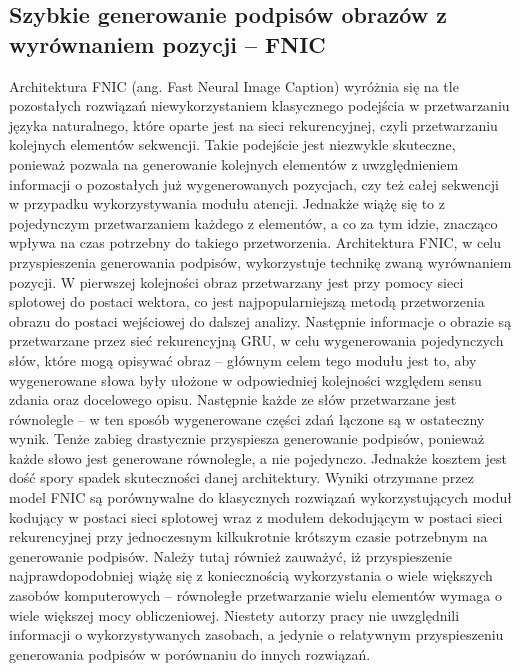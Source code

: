 \subsection{Szybkie generowanie podpisów obrazów z wyrównaniem pozycji -- FNIC}
Architektura FNIC \cite{fnic} (ang. Fast Neural Image Caption) wyróżnia się na tle pozostałych rozwiązań niewykorzystaniem klasycznego podejścia w przetwarzaniu języka naturalnego, które oparte jest na sieci rekurencyjnej, czyli przetwarzaniu kolejnych elementów sekwencji. Takie podejście jest niezwykle skuteczne, ponieważ pozwala na generowanie kolejnych elementów z uwzględnieniem informacji o pozostałych już wygenerowanych pozycjach, czy też całej sekwencji w przypadku wykorzystywania modułu atencji. Jednakże wiążę się to z pojedynczym przetwarzaniem każdego z elementów, a co za tym idzie, znacząco wpływa na czas potrzebny do takiego przetworzenia. Architektura FNIC, w celu przyspieszenia generowania podpisów, wykorzystuje technikę zwaną wyrównaniem pozycji. W pierwszej kolejności obraz przetwarzany jest przy pomocy sieci splotowej do postaci wektora, co jest najpopularniejszą metodą przetworzenia obrazu do postaci wejściowej do dalszej analizy. Następnie informacje o obrazie są przetwarzane przez sieć rekurencyjną GRU, w celu wygenerowania pojedynczych słów, które mogą opisywać obraz -- głównym celem tego modułu jest to, aby wygenerowane słowa były ułożone w odpowiedniej kolejności względem sensu zdania oraz docelowego opisu. Następnie każde ze słów przetwarzane jest równolegle -- w ten sposób wygenerowane części zdań łączone są w ostateczny wynik. Tenże zabieg drastycznie przyspiesza generowanie podpisów, ponieważ każde słowo jest generowane równolegle, a nie pojedynczo. Jednakże kosztem jest dość spory spadek skuteczności danej architektury. Wyniki otrzymane przez model FNIC są porównywalne do klasycznych rozwiązań wykorzystujących moduł kodujący w postaci sieci splotowej wraz z modułem dekodującym w postaci sieci rekurencyjnej przy jednoczesnym kilkukrotnie krótszym czasie potrzebnym na generowanie podpisów. Należy tutaj również zauważyć, iż przyspieszenie najprawdopodobniej wiążę się z koniecznością wykorzystania o wiele większych zasobów komputerowych -- równoległe przetwarzanie wielu elementów wymaga o wiele większej mocy obliczeniowej. Niestety autorzy pracy nie uwzględnili informacji o wykorzystywanych zasobach, a jedynie o relatywnym przyspieszeniu generowania podpisów w porównaniu do innych rozwiązań.

